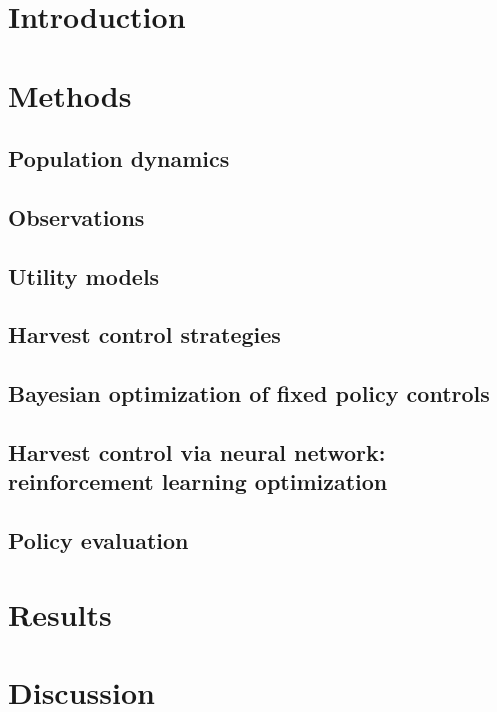\documentclass[floatfix,nofootinbib,longbibliography,notitlepage]{revtex4-1}
\begin{document}
\maketitle

\tableofcontents
\makeatletter
\let\toc@pre\relax
\let\toc@post\relax
\makeatother 

%
%
%
\section{Introduction}


%
%
%
\section{Methods}

\subsection{Population dynamics}

\subsection{Observations}

\subsection{Utility models}

\subsection{Harvest control strategies}

\subsection{Bayesian optimization of fixed policy controls}

\subsection{Harvest control via neural network: reinforcement learning optimization}

\subsection{Policy evaluation}


%
%
%
\section{Results}


%
%
%
\section{Discussion}





\end{document}
